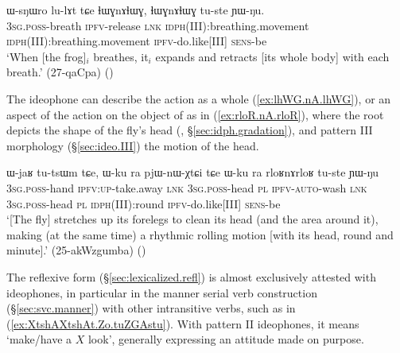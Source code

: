 \begin{exe}
\ex \label{ex:lhWG.nA.lhWG}
\gll ɯ-sŋɯro lu-lɤt tɕe ɬɯɣnɤɬɯɣ, ɬɯɣnɤɬɯɣ tu-ste ɲɯ-ŋu.\\
\textsc{3sg}.\textsc{poss}-breath \textsc{ipfv}-release \textsc{lnk} \textsc{idph}(III):breathing.movement \textsc{idph}(III):breathing.movement \textsc{ipfv}-do.like[III] \textsc{sens}-be \\
\glt `When [the frog]$_i$ breathes, it$_i$ expands and retracts [its whole body] with each breath.' (27-qaCpa)
()
\end{exe}

The ideophone can describe the action as a whole (\ref{ex:lhWG.nA.lhWG}), or an aspect of the action on the object of  as in (\ref{ex:rloR.nA.rloR}), where the root    depicts the shape of the fly's head (, §\ref{sec:idph.gradation}), and pattern III morphology (§\ref{sec:ideo.III}) the motion of the head.

\begin{exe}
\ex \label{ex:rloR.nA.rloR}
\gll ɯ-jaʁ tu-tsɯm tɕe, ɯ-ku ra pjɯ-nɯ-χtɕi tɕe ɯ-ku ra rloʁnɤrloʁ tu-ste ɲɯ-ŋu \\
\textsc{3sg}.\textsc{poss}-hand \textsc{ipfv}:\textsc{up}-take.away \textsc{lnk} \textsc{3sg}.\textsc{poss}-head \textsc{pl} \textsc{ipfv}-\textsc{auto}-wash \textsc{lnk} \textsc{3sg}.\textsc{poss}-head \textsc{pl}  \textsc{idph}(III):round  \textsc{ipfv}-do.like[III] \textsc{sens}-be \\ 
\glt `[The fly] stretches up its forelegs to clean its head (and the area around it), making (at the same time) a rhythmic rolling motion [with its head, round and minute].' (25-akWzgumba)
()
\end{exe}

The reflexive form  (§\ref{sec:lexicalized.refl}) is almost exclusively attested with ideophones, in particular in the manner serial verb construction (§\ref{sec:svc.manner}) with other intransitive verbs, such as  in (\ref{ex:XtshAXtshAt.Zo.tuZGAstu}). With pattern II ideophones, it means `make/have a $X$ look', generally expressing an attitude made on purpose.

